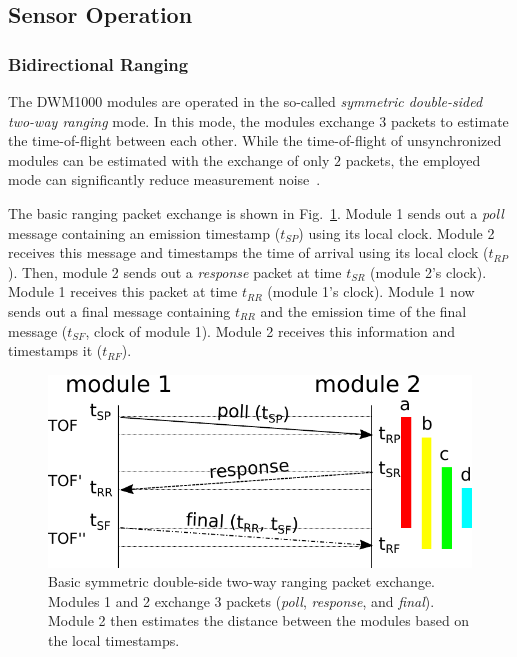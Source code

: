 \subsection{Sensor Operation}
\subsubsection{Bidirectional Ranging}
The DWM1000 modules are operated in the so-called \emph{symmetric double-sided two-way ranging} mode.
In this mode, the modules exchange $3$ packets to estimate the time-of-flight between each other.
While the time-of-flight of unsynchronized modules can be estimated with the exchange of only $2$ packets, the employed mode can significantly reduce measurement noise~\cite{decawave}.

The basic ranging packet exchange is shown in Fig.~\ref{fig:bidirectional_ranging}.
Module 1 sends out a \emph{poll} message containing an emission timestamp ($t_{SP}$) using its local clock.
Module 2 receives this message and timestamps the time of arrival using its local clock ($t_{RP}$).
Then, module 2 sends out a \emph{response} packet at time $t_{SR}$ (module 2's clock).
Module 1 receives this packet at time $t_{RR}$  (module 1's clock).
Module 1 now sends out a final message containing $t_{RR}$ and the emission time of the final message ($t_{SF}$, clock of module 1).
Module 2 receives this information and timestamps it ($t_{RF}$). 


\begin{figure}[tpbh]
 \centering
  \includegraphics[width=.8\linewidth]{tex/img/bidirectional_ranging.pdf}
 \caption{Basic symmetric double-side two-way ranging packet exchange. 
 Modules 1 and 2 exchange 3 packets (\emph{poll}, \emph{response}, and \emph{final}). Module 2 then estimates the distance between the modules based on the local timestamps.}
\label{fig:bidirectional_ranging}
 \end{figure}

